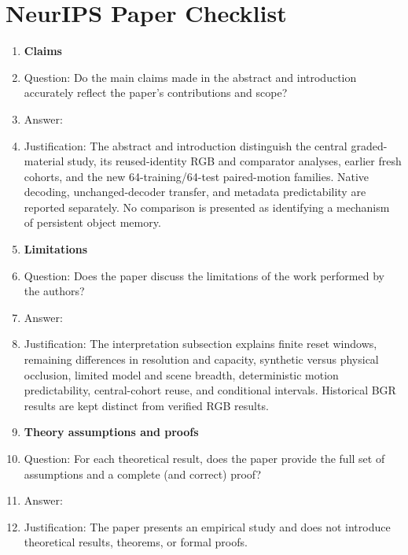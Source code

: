 \section*{NeurIPS Paper Checklist}

\begin{enumerate}

\item {\bf Claims}
    \item[] Question: Do the main claims made in the abstract and introduction accurately reflect the paper's contributions and scope?
    \item[] Answer: \answerYes{}
    \item[] Justification: The abstract and introduction distinguish the central graded-material study, its reused-identity RGB and comparator analyses, earlier fresh cohorts, and the new 64-training/64-test paired-motion families. Native decoding, unchanged-decoder transfer, and metadata predictability are reported separately. No comparison is presented as identifying a mechanism of persistent object memory.


\item {\bf Limitations}
    \item[] Question: Does the paper discuss the limitations of the work performed by the authors?
    \item[] Answer: \answerYes{}
    \item[] Justification: The interpretation subsection explains finite reset windows, remaining differences in resolution and capacity, synthetic versus physical occlusion, limited model and scene breadth, deterministic motion predictability, central-cohort reuse, and conditional intervals. Historical BGR results are kept distinct from verified RGB results.


\item {\bf Theory assumptions and proofs}
    \item[] Question: For each theoretical result, does the paper provide the full set of assumptions and a complete (and correct) proof?
    \item[] Answer: \answerNA{}
    \item[] Justification: The paper presents an empirical study and does not introduce theoretical results, theorems, or formal proofs.



\end{enumerate}
